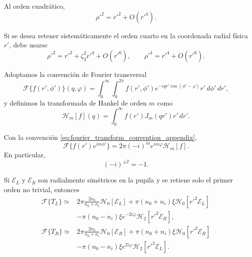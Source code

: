 Al orden cuadrático,
\begin{equation}
\rho'^2=r'^2+O(r'^4).
\label{eq:rho_prime_r_prime_second_order}
\end{equation}

Si se desea retener sistemáticamente el orden cuarto en la coordenada radial física \(r'\), debe usarse
\begin{equation}
\rho'^2
=
r'^2+\zeta_2^2r'^4+O(r'^6),
\qquad
\rho'^4
=
r'^4+O(r'^6).
\label{eq:rho_prime_r_prime_fourth_order}
\end{equation}

Adoptamos la convención de Fourier transversal
\begin{equation}
\mathscr F\{f(r',\phi')\}(q,\varphi)
=
\int_0^\infty
\int_0^{2\pi}
f(r',\phi')
e^{-iqr'\cos(\phi'-\varphi)}
r'\,d\phi'\,dr',
\label{eq:fourier_transform_convention_appendix}
\end{equation}
y definimos la transformada de Hankel de orden \(m\) como \cite{Watson1944}
\begin{equation}
\mathscr H_m[f](q)
=
\int_0^\infty
f(r')J_m(qr')r'\,dr'.
\label{eq:hankel_transform_definition_appendix}
\end{equation}

Con la convención \eqref{eq:fourier_transform_convention_appendix},
\begin{equation}
\mathscr F\{f(r')e^{im\phi'}\}
=
2\pi(-i)^m e^{im\varphi}\mathscr H_m[f].
\label{eq:fourier_hankel_angular_identity}
\end{equation}
En particular,
\begin{equation}
(-i)^{\pm2}=-1.
\label{eq:hankel_order_two_phase_factor}
\end{equation}

Si \(\mathscr E_L\) y \(\mathscr E_R\) son radialmente simétricos en la pupila y se retiene solo el primer orden no trivial, entonces
\begin{align}
\mathscr F\{T_L\}
\simeq{}&
2\pi
\frac{2n_0}{n_0+n_i}
\mathscr H_0[\mathscr E_L]
+
\pi
(n_0+n_i)\xi
\mathscr H_0[r'^2\mathscr E_L]
\nonumber
\\[4pt]
&-
\pi
(n_0-n_i)\xi
e^{-2i\varphi}
\mathscr H_2[r'^2\mathscr E_R],
\label{eq:FT_TL_paraxial_corrected}
\\[10pt]
\mathscr F\{T_R\}
\simeq{}&
2\pi
\frac{2n_0}{n_0+n_i}
\mathscr H_0[\mathscr E_R]
+
\pi
(n_0+n_i)\xi
\mathscr H_0[r'^2\mathscr E_R]
\nonumber
\\[4pt]
&-
\pi
(n_0-n_i)\xi
e^{2i\varphi}
\mathscr H_2[r'^2\mathscr E_L].
\label{eq:FT_TR_paraxial_corrected}
\end{align}

